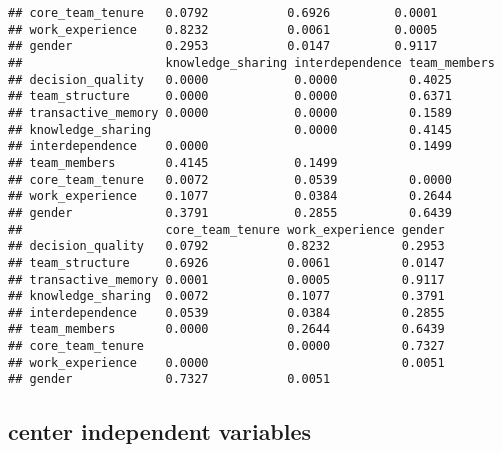 \documentclass[]{article}
\begin{document}
\begin{verbatim}
## core_team_tenure   0.0792           0.6926         0.0001            
## work_experience    0.8232           0.0061         0.0005            
## gender             0.2953           0.0147         0.9117            
##                    knowledge_sharing interdependence team_members
## decision_quality   0.0000            0.0000          0.4025      
## team_structure     0.0000            0.0000          0.6371      
## transactive_memory 0.0000            0.0000          0.1589      
## knowledge_sharing                    0.0000          0.4145      
## interdependence    0.0000                            0.1499      
## team_members       0.4145            0.1499                      
## core_team_tenure   0.0072            0.0539          0.0000      
## work_experience    0.1077            0.0384          0.2644      
## gender             0.3791            0.2855          0.6439      
##                    core_team_tenure work_experience gender
## decision_quality   0.0792           0.8232          0.2953
## team_structure     0.6926           0.0061          0.0147
## transactive_memory 0.0001           0.0005          0.9117
## knowledge_sharing  0.0072           0.1077          0.3791
## interdependence    0.0539           0.0384          0.2855
## team_members       0.0000           0.2644          0.6439
## core_team_tenure                    0.0000          0.7327
## work_experience    0.0000                           0.0051
## gender             0.7327           0.0051
\end{verbatim}

\hypertarget{center-independent-variables}{%
\subsection{center independent
variables}\label{center-independent-variables}}
\end{document}
